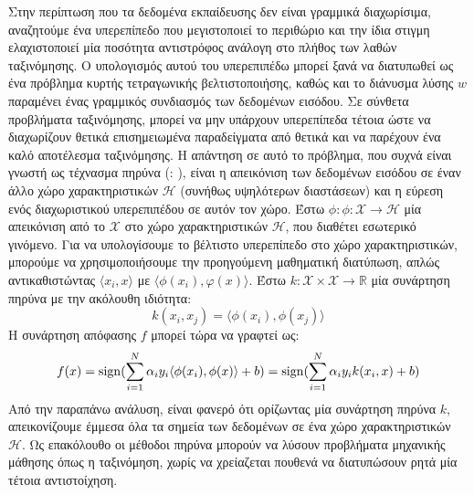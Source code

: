 Στην περίπτωση που τα δεδομένα εκπαίδευσης δεν είναι γραμμικά διαχωρίσιμα, αναζητούμε ένα υπερεπίπεδο που μεγιστοποιεί το περιθώριο και την ίδια στιγμη ελαχιστοποιεί μία ποσότητα αντιστρόφος ανάλογη στο πλήθος των λαθών ταξινόμησης.
Ο υπολογισμός αυτού του υπερεπιπέδω μπορεί ξανά να διατυπωθεί ως ένα πρόβλημα κυρτής τετραγωνικής βελτιστοποιήσης, καθώς και το διάνυσμα λύσης $w$ παραμένει ένας γραμμικός συνδιασμός των δεδομένων εισόδου.
Σε σύνθετα προβλήματα ταξινόμησης, μπορεί να μην υπάρχουν υπερεπίπεδα τέτοια ώστε να διαχωρίζουν θετικά επισημειωμένα παραδείγματα από θετικά και να παρέχουν ένα καλό αποτέλεσμα ταξινόμησης.
Η απάντηση σε αυτό το πρόβλημα, που συχνά είναι γνωστή ως τέχνασμα πηρύνα (: \cite{Aizerman67theoretical, Boser1992}), είναι η απεικόνιση των δεδομένων εισόδου σε έναν άλλο χώρο χαρακτηριστικών $\mathcal{H}$ (συνήθως υψηλότερων διαστάσεων) και η εύρεση ενός διαχωριστικού υπερεπιπέδου σε αυτόν τον χώρο.
Έστω $\phi : \mathcal{\phi} : \mathcal{X} \rightarrow \mathcal{H}$ μία απεικόνιση από το $\mathcal{X}$ στο χώρο χαρακτηριστικών $\mathcal{H}$, που διαθέτει εσωτερικό γινόμενο.
Για να υπολογίσουμε το βέλτιστο υπερεπίπεδο στο χώρο χαρακτηριστικών, μπορούμε να χρησιμοποιήσουμε την προηγούμενη μαθηματική διατύπωση, απλώς αντικαθιστώντας $\langle x_{i} , x \rangle$ με $\langle \phi(x_{i}), φ(x) \rangle$.
Έστω $k : \mathcal{X} \times \mathcal{X} \rightarrow \mathbb{R}$ μία συνάρτηση πηρύνα με την ακόλουθη ιδιότητα:
\begin{equation}
k(x_{i}, x_{j}) = \langle \phi (x_{i}), \phi (x_{j}) \rangle    
\end{equation}
Η συνάρτηση απόφασης $f$ μπορεί τώρα να γραφτεί ως:
\begin{equation}
f(x) = \operatorname{sign}(\sum_{i=1}^{N}\alpha_{i} y_{i} \langle \phi(x_{i}), \phi(x) \rangle + b ) = \operatorname{sign}(\sum_{i=1}^{N}\alpha_{i}y_{i} k(x_{i}, x) + b)
\end{equation}
Από την παραπάνω ανάλυση, είναι φανερό ότι ορίζωντας μία συνάρτηση πηρύνα $k$, απεικονίζουμε έμμεσα όλα τα σημεία των δεδομένων σε ένα χώρο χαρακτηριστικών $\mathcal{H}$. 
Ως επακόλουθο οι μέθοδοι πηρύνα μπορούν να λύσουν προβλήματα μηχανικής μάθησης όπως η ταξινόμηση, χωρίς να χρείαζεται πουθενά να διατυπώσουν ρητά μία τέτοια αντιστοίχηση.

